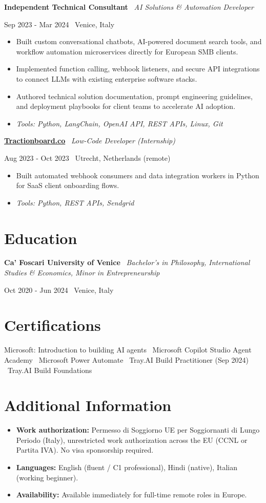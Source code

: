 \documentclass[a4paper,10pt]{article}
\newcommand{\role}[4]{%
  \vspace{2pt}\noindent
  \begin{minipage}[t]{0.70\textwidth}\raggedright\textbf{#1} \textbullet\ \textit{#3}\end{minipage}%
  \hfill
  \begin{minipage}[t]{0.28\textwidth}\raggedleft\footnotesize\color{gray}#2 \textbullet\ #4\end{minipage}%
  \vspace{1pt}%
}
\begin{document}
\role{Independent Technical Consultant}{Sep 2023 - Mar 2024}{AI Solutions \& Automation Developer}{Venice, Italy}
\begin{itemize}
  \item Built custom conversational chatbots, AI-powered document search tools, and workflow automation microservices directly for European SMB clients.
  \item Implemented function calling, webhook listeners, and secure API integrations to connect LLMs with existing enterprise software stacks.
  \item Authored technical solution documentation, prompt engineering guidelines, and deployment playbooks for client teams to accelerate AI adoption.
  \item \textit{Tools: Python, LangChain, OpenAI API, REST APIs, Linux, Git}
\end{itemize}

\role{\href{https://tractionboard.co}{Tractionboard.co}}{Aug 2023 - Oct 2023}{Low-Code Developer (Internship)}{Utrecht, Netherlands (remote)}
\begin{itemize}
  \item Built automated webhook consumers and data integration workers in Python for SaaS client onboarding flows.
  \item \textit{Tools: Python, REST APIs, Sendgrid}
\end{itemize}

\section{Education}
\role{Ca' Foscari University of Venice}{Oct 2020 - Jun 2024}{Bachelor's in Philosophy, International Studies \& Economics, Minor in Entrepreneurship}{Venice, Italy}

\section{Certifications}
Microsoft: Introduction to building AI agents \textbullet\ Microsoft Copilot Studio Agent Academy \textbullet\ Microsoft Power Automate \textbullet\ Tray.AI Build Practitioner (Sep 2024) \textbullet\ Tray.AI Build Foundations

\section{Additional Information}
\begin{itemize}
  \item \textbf{Work authorization:} Permesso di Soggiorno UE per Soggiornanti di Lungo Periodo (Italy), unrestricted work authorization across the EU (CCNL or Partita IVA). No visa sponsorship required.
  \item \textbf{Languages:} English (fluent / C1 professional), Hindi (native), Italian (working beginner).
  \item \textbf{Availability:} Available immediately for full-time remote roles in Europe.
\end{itemize}
\end{document}
